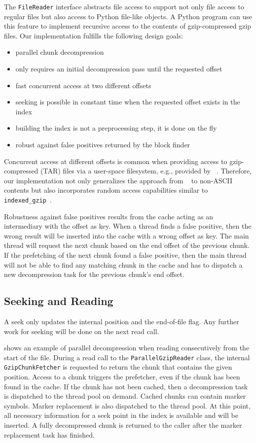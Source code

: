 The \texttt{FileReader} interface abstracts file access to support not only file access to regular files but also access to Python file-like objects.
A Python program can use this feature to implement recursive access to the contents of gzip-compressed gzip files. %
Our implementation fulfills the following design goals:
\begin{itemize}
    \item parallel chunk decompression
    \item only requires an initial decompression pass until the requested offset
    \item fast concurrent access at two different offsets
    \item seeking is possible in constant time when the requested offset exists in the index
    \item building the index is not a preprocessing step, it is done on the fly
    \item robust against false positives returned by the block finder
\end{itemize}
Concurrent access at different offsets is common when providing access to gzip-compressed (TAR) files via a user-space filesystem, e.g., provided by ~\cite{ratarmount}.
Therefore, our implementation not only generalizes the approach from \pugz~\cite{pugz} to non-ASCII contents but also incorporates random access capabilities similar to \texttt{indexed\_gzip}~\cite{indexed_gzip}.

Robustness against false positives results from the cache acting as an intermediary with the offset as key.
When a thread finds a false positive, then the wrong result will be inserted into the cache with a wrong offset as key.
The main thread will request the next chunk based on the end offset of the previous chunk.
If the prefetching of the next chunk found a false positive, then the main thread will not be able to find any matching chunk in the cache and has to dispatch a new decompression task for the previous chunk's end offset.


\subsection{Seeking and Reading}

A seek only updates the internal position and the end-of-file flag.
Any further work for seeking will be done on the next read call.

 shows an example of parallel decompression when reading consecutively from the start of the file.
During a read call to the \texttt{ParallelGzipReader} class, the internal \texttt{GzipChunkFetcher} is requested to return the chunk that contains the given position.
Access to a chunk triggers the prefetcher, even if the chunk has been found in the cache.
If the chunk has not been cached, then a decompression task is dispatched to the thread pool on demand.
Cached chunks can contain marker symbols.
Marker replacement is also dispatched to the thread pool.
At this point, all necessary information for a seek point in the index is available and will be inserted.
A fully decompressed chunk is returned to the caller after the marker replacement task has finished.


